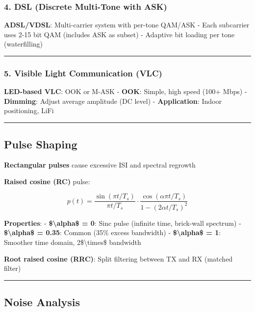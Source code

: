 \subsubsection{4. DSL (Discrete Multi-Tone with
ASK)}\label{dsl-discrete-multi-tone-with-ask}

\textbf{ADSL/VDSL}: Multi-carrier system with per-tone QAM/ASK - Each
subcarrier uses 2-15 bit QAM (includes ASK as subset) - Adaptive bit
loading per tone (waterfilling)

\begin{center}\rule{0.5\linewidth}{0.5pt}\end{center}

\subsubsection{5. Visible Light Communication
(VLC)}\label{visible-light-communication-vlc}

\textbf{LED-based VLC}: OOK or M-ASK - \textbf{OOK}: Simple, high speed
(100+ Mbps) - \textbf{Dimming}: Adjust average amplitude (DC level) -
\textbf{Application}: Indoor positioning, LiFi

\begin{center}\rule{0.5\linewidth}{0.5pt}\end{center}

\subsection{Pulse Shaping}\label{pulse-shaping}

\textbf{Rectangular pulses} cause excessive ISI and spectral regrowth

\textbf{Raised cosine (RC)} pulse:

\[
p(t) = \frac{\sin(\pi t/T_s)}{\pi t/T_s} \cdot \frac{\cos(\alpha \pi t/T_s)}{1 - (2\alpha t/T_s)^2}
\]

\textbf{Properties}: - \textbf{\$\textbackslash alpha\$ = 0}: Sinc pulse
(infinite time, brick-wall spectrum) - \textbf{\$\textbackslash alpha\$
= 0.35}: Common (35\% excess bandwidth) -
\textbf{\$\textbackslash alpha\$ = 1}: Smoother time domain,
2\$\textbackslash times\$ bandwidth

\textbf{Root raised cosine (RRC)}: Split filtering between TX and RX
(matched filter)

\begin{center}\rule{0.5\linewidth}{0.5pt}\end{center}

\subsection{Noise Analysis}\label{noise-analysis}

